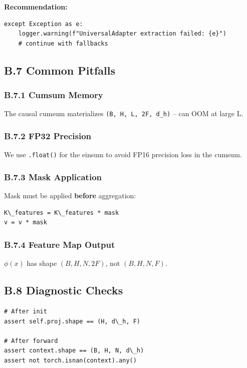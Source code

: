 \textbf{Recommendation:}
\begin{lstlisting}
except Exception as e:
    logger.warning(f"UniversalAdapter extraction failed: {e}")
    # continue with fallbacks
\end{lstlisting}

\subsection{B.7 Common Pitfalls}

\subsubsection{B.7.1 Cumsum Memory}

The causal cumsum materializes \texttt{(B, H, L, 2F, d\_h)} -- can OOM at 
large L.

\subsubsection{B.7.2 FP32 Precision}

We use \texttt{.float()} for the einsum to avoid FP16 precision loss in the 
cumsum.

\subsubsection{B.7.3 Mask Application}

Mask must be applied \textbf{before} aggregation:

\begin{lstlisting}
K\_features = K\_features * mask
v = v * mask
\end{lstlisting}

\subsubsection{B.7.4 Feature Map Output}

$\phi(x)$ has shape $(B, H, N, 2F)$, not $(B, H, N, F)$.

\subsection{B.8 Diagnostic Checks}

\begin{lstlisting}
# After init
assert self.proj.shape == (H, d\_h, F)

# After forward
assert context.shape == (B, H, N, d\_h)
assert not torch.isnan(context).any()
\end{lstlisting}



